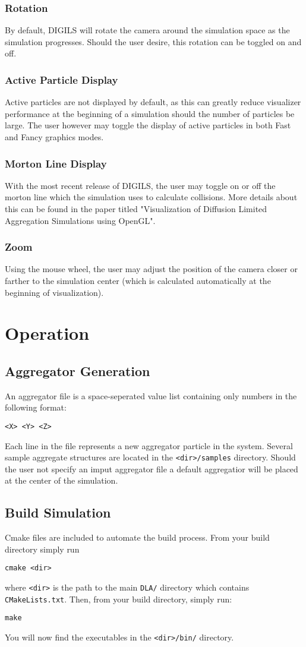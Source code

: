 \documentclass[fleqn,10pt]{SelfArx} %
\begin{document}
\subsubsection{Rotation}
By default, DIGILS will rotate the camera around the simulation space as the simulation progresses. Should the user desire, this rotation can be toggled on and off.

\subsubsection{Active Particle Display}
Active particles are not displayed by default, as this can greatly reduce visualizer performance at the beginning of a simulation should the number of particles be large. The user however may toggle the display of active particles in both Fast and Fancy graphics modes.
\subsubsection{Morton Line Display}
With the most recent release of DIGILS, the user may toggle on or off the morton line which the simulation uses to calculate collisions. More details about this can be found in the paper titled "Visualization of Diffusion Limited Aggregation Simulations using OpenGL".
\subsubsection{Zoom}
Using the mouse wheel, the user may adjust the position of the camera closer or farther to the simulation center (which is calculated automatically at the beginning of visualization).
\section{Operation}
\subsection{Aggregator Generation}
An aggregator file is a space-seperated value list containing only numbers in the following format:
\begin{center}
    \texttt{<X> <Y> <Z>}
\end{center}
Each line in the file represents a new aggregator particle in the system. Several sample aggregate structures are located in the \texttt{<dir>/samples} directory. Should the user not specify an imput aggregator file a default aggregatior will be placed at the center of the simulation.
\subsection{Build Simulation}
Cmake files are included to automate the build process. From your build directory simply run
\begin{center}
    \texttt{cmake <dir>}
\end{center}
where \texttt{<dir>} is the path to the main \texttt{DLA/} directory which contains \texttt{CMakeLists.txt}.
Then, from your build directory, simply run:
\begin{center}
    \texttt{make}
\end{center}
You will now find the executables in the \texttt{<dir>/bin/} directory.
\end{document}
